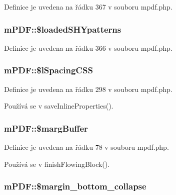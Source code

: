Definice je uvedena na řádku 367 v souboru mpdf.\-php.

\hypertarget{classm_p_d_f_a1682d7e5f531cb9ce024a2ca4f38b695}{
\subsubsection[{\$loaded\-S\-H\-Ypatterns}]{\setlength{\rightskip}{0pt plus 5cm}m\-P\-D\-F\-::\$loaded\-S\-H\-Ypatterns}}\label{classm_p_d_f_a1682d7e5f531cb9ce024a2ca4f38b695}


Definice je uvedena na řádku 366 v souboru mpdf.\-php.

\hypertarget{classm_p_d_f_a25e2d271b7a085fbb4d138c1fe50d79d}{
\subsubsection[{\$l\-Spacing\-C\-S\-S}]{\setlength{\rightskip}{0pt plus 5cm}m\-P\-D\-F\-::\$l\-Spacing\-C\-S\-S}}\label{classm_p_d_f_a25e2d271b7a085fbb4d138c1fe50d79d}


Definice je uvedena na řádku 298 v souboru mpdf.\-php.



Používá se v save\-Inline\-Properties().

\hypertarget{classm_p_d_f_a6041f9858fed7cf63985941f60aee26f}{
\subsubsection[{\$marg\-Buffer}]{\setlength{\rightskip}{0pt plus 5cm}m\-P\-D\-F\-::\$marg\-Buffer}}\label{classm_p_d_f_a6041f9858fed7cf63985941f60aee26f}


Definice je uvedena na řádku 78 v souboru mpdf.\-php.



Používá se v finish\-Flowing\-Block().

\hypertarget{classm_p_d_f_a4502be9578634cd40b9356521c72c3fb}{
\subsubsection[{\$margin\-\_\-bottom\-\_\-collapse}]{\setlength{\rightskip}{0pt plus 5cm}m\-P\-D\-F\-::\$margin\-\_\-bottom\-\_\-collapse}}\label{classm_p_d_f_a4502be9578634cd40b9356521c72c3fb}



